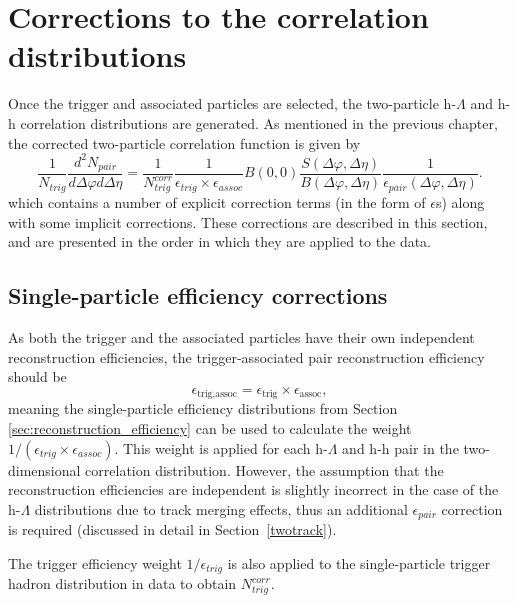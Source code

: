 \clearpage 

\section{Corrections to the correlation distributions}
\label{sec:corrections}

Once the trigger and associated particles are selected, the two-particle h-$\Lambda$ and h-h correlation distributions are generated. As mentioned in the previous chapter, the corrected two-particle correlation function is given by
%
\begin{equation}
    \frac{1}{N_{trig}}\frac{d^2N_{pair}}{d\Delta\varphi d\Delta\eta} = \frac{1}{N_{trig}^{corr}}\frac{1}{\epsilon_{trig}\times\epsilon_{assoc}}B(0,0)\frac{S(\Delta\varphi, \Delta\eta)}{B(\Delta\varphi, \Delta\eta)}\frac{1}{\epsilon_{pair}(\Delta\varphi, \Delta\eta)}.
\label{eq:corr_detector}
\end{equation}
%
which contains a number of explicit correction terms (in the form of $\epsilon$s) along with some implicit corrections. These corrections are described in this section, and are presented in the order in which they are applied to the data.

\subsection{Single-particle efficiency corrections}

As both the trigger and the associated particles have their own independent reconstruction efficiencies, the trigger-associated pair reconstruction efficiency should be
%
\begin{equation}
	\epsilon_{\text{trig}, \text{assoc}} = \epsilon_{\text{trig}}\times\epsilon_{\text{assoc}},
\end{equation} 
%
meaning the single-particle efficiency distributions from Section \ref{sec:reconstruction_efficiency} can be used to calculate the weight $1/(\epsilon_{trig}\times\epsilon_{assoc})$. This weight is applied for each h-$\Lambda$ and h-h pair in the two-dimensional correlation distribution. However, the assumption that the reconstruction efficiencies are independent is slightly incorrect in the case of the h-$\Lambda$ distributions due to track merging effects, thus an additional $\epsilon_{pair}$ correction is required (discussed in detail in Section~\ref{twotrack}).

The trigger efficiency weight $1/\epsilon_{trig}$ is also applied to the single-particle trigger hadron distribution in data to obtain $N_{trig}^{corr}$. 

